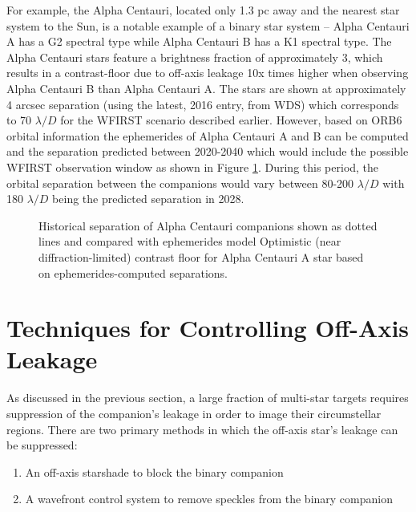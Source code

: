 \documentclass[]{spie}  %
\begin{document}
For example, the Alpha Centauri, located only 1.3 pc away and the nearest star system to the Sun, is a notable example of a binary star system -- Alpha Centauri A has a G2 spectral type while Alpha Centauri B has a K1 spectral type. The Alpha Centauri stars feature a brightness fraction of approximately 3, which results in a contrast-floor due to off-axis leakage 10x times higher when observing Alpha Centauri B than Alpha Centauri A. The stars are shown at approximately 4 arcsec separation (using the latest, 2016 entry, from WDS) which corresponds to 70 $\lambda/D$ for the WFIRST scenario described earlier. However, based on ORB6 orbital information the ephemerides of Alpha Centauri A and B can be computed and the separation predicted between 2020-2040 which would include the possible WFIRST observation window as shown in Figure \ref{fig:alphaCen}. During this period, the orbital separation between the companions would vary between 80-200 $\lambda/D$ with 180 $\lambda/D$ being the predicted separation in 2028. 

\begin{figure}[b!]
\centering
{}
\caption[Companion Leakage]
{\label{fig:alphaCen}  Historical separation of Alpha Centauri companions shown as dotted lines and compared with ephemerides model  Optimistic (near diffraction-limited) contrast floor for Alpha Centauri A star based on ephemerides-computed separations.}
\end{figure}

\section{Techniques for Controlling Off-Axis Leakage} \label{sect:leakage}

As discussed  in the previous section, a large fraction of multi-star targets requires suppression of the companion's leakage in order to image their circumstellar regions. There are two primary methods in which the off-axis star's leakage can be suppressed:
\begin{enumerate}
\item An off-axis starshade to block the binary companion
\item A wavefront control system to remove speckles from the binary companion
\end{enumerate}
\end{document}
